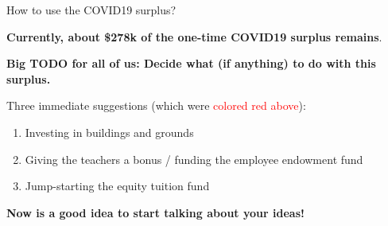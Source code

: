 \documentclass[8pt]{beamer}
\begin{document}

\begin{frame}{How to use the COVID19 surplus?}

\textbf{Currently, about \$278k of the one-time COVID19 surplus remains}.

\textbf{Big TODO for all of us: Decide what (if
anything) to do with this surplus.}

Three immediate suggestions (which were \textcolor{red}{colored red above}):
%
\begin{enumerate}
%
\item Investing in buildings and grounds
\item Giving the teachers a bonus / funding the employee endowment fund
\item Jump-starting the equity tuition fund
%
\end{enumerate}
%
\textbf{Now is a good idea to start talking about your ideas!}


\end{frame}
\end{document}
